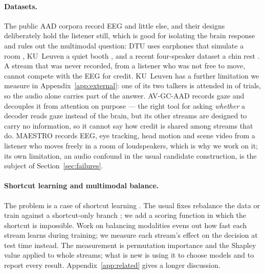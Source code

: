 \paragraph{Datasets.}
The public AAD corpora record EEG and little else, and their designs deliberately
hold the listener still, which is good for isolating the brain response and
rules out the multimodal question: DTU uses earphones that simulate a room
\citep{fuglsang2018dtu}, KU~Leuven a quiet booth \citep{biesmans2017kul,das2019kuldata},
and a recent four-speaker dataset a chin rest \citep{yan2024fourspeaker}. A
stream that was never recorded, from a listener who was not free to move, cannot
compete with the EEG for credit. KU~Leuven has a further limitation we measure in
Appendix~\ref{app:external}: one of its two talkers is attended in
 of  trials, so the audio alone
carries part of the answer. AV-GC-AAD \citep{geirnaert2024avgc} records gaze and
decouples it from attention on purpose --- the right tool for asking
\emph{whether} a decoder reads gaze instead of the brain, but its other streams
are designed to carry no information, so it cannot say how credit is shared among
streams that do. MAESTRO \citep{maestro2026} records EEG, eye tracking, head
motion and scene video from a listener who moves freely in a room of
loudspeakers, which is why we work on it; its own limitation, an audio confound
in the usual candidate construction, is the subject of
Section~\ref{sec:failures}.

\paragraph{Shortcut learning and multimodal balance.}
The problem is a case of shortcut learning
\citep{geirhos2020,torralba2011,gururangan2018}. The usual fixes rebalance the
data \citep{goyal2017vqa} or train against a shortcut-only branch
\citep{cadene2019rubi}; we add a scoring function in which the shortcut is
impossible. Work on balancing modalities
\citep{wang2020gradblend,huang2022competition,wu2022greedy,peng2022ogm} evens out
how fast each stream learns during training; we measure each stream's effect on
the decision at test time instead. The measurement is permutation importance
\citep{breiman2001,fisher2019} and the Shapley value
\citep{shapley1953,lundberg2017,covert2020} applied to whole streams; what is new
is using it to choose models and to report every result.
Appendix~\ref{app:related} gives a longer discussion.
